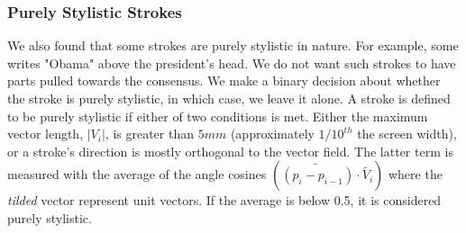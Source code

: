 \subsubsection{Purely Stylistic Strokes}

We also found that some strokes are purely stylistic in nature. For example, some writes "Obama" above the president's head. We do not want such strokes to have parts pulled towards the consensus. We make a binary decision about whether the stroke is purely stylistic, in which case, we leave it alone. A stroke is defined to be purely stylistic if either of two conditions is met. Either the maximum vector length, $|V_i|$, is greater than $5mm$ (approximately $1/10^{th}$ the screen width), or a stroke's direction is mostly orthogonal to the vector field. The latter term is measured with the average of the angle cosines $(\tilde{(p_i - p_{i-1})} \cdot \tilde{V_i})$ where the {\em tilded} vector represent unit vectors. If the average is below 0.5, it is considered purely stylistic.






